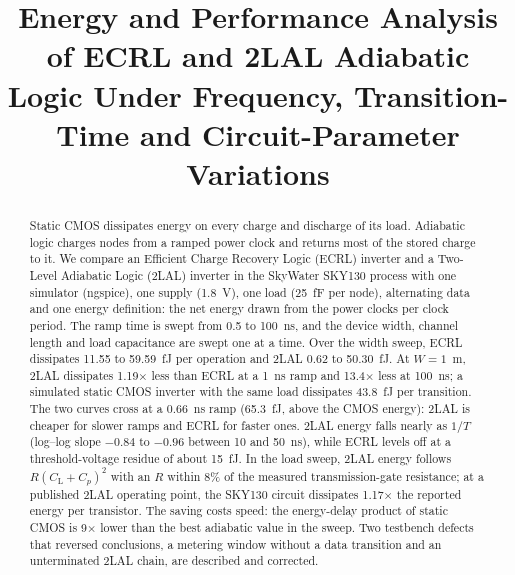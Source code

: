 \documentclass[conference]{IEEEtran}
\newcommand{\CL}{C_{\mathrm{L}}}
\begin{document}
\title{Energy and Performance Analysis of ECRL and 2LAL Adiabatic Logic Under
Frequency, Transition-Time and Circuit-Parameter Variations}

\author{%
}

\maketitle

\begin{abstract}
Static CMOS dissipates energy on every charge and discharge of its load.
Adiabatic logic charges nodes from a ramped power clock and returns most of
the stored charge to it. We compare an Efficient Charge Recovery Logic (ECRL)
inverter and a Two-Level Adiabatic Logic (2LAL) inverter in the SkyWater
SKY130 process with one simulator (ngspice), one supply (1.8~V), one load
(25~fF per node), alternating data and one energy definition: the net energy
drawn from the power clocks per clock period. The ramp time is swept from 0.5
to 100~ns, and the device width, channel length and load capacitance are swept
one at a time. Over the width sweep, ECRL dissipates 11.55 to 59.59~fJ per
operation and 2LAL 0.62 to 50.30~fJ. At $W=1$~\textmu m, 2LAL dissipates
1.19$\times$ less than ECRL at a 1~ns ramp and 13.4$\times$ less at 100~ns; a
simulated static CMOS inverter with the same load dissipates 43.8~fJ per
transition. The two curves cross at a 0.66~ns ramp (65.3~fJ, above the CMOS
energy): 2LAL is cheaper for slower ramps and ECRL for faster ones. 2LAL
energy falls nearly as $1/T$ (log--log slope $-0.84$ to
$-0.96$ between 10 and 50~ns), while ECRL levels off at a threshold-voltage
residue of about 15~fJ. In the load sweep, 2LAL energy follows
$R(\CL+C_p)^2$ with an $R$ within 8\% of the measured transmission-gate
resistance; at a published 2LAL operating point, the SKY130 circuit dissipates
1.17$\times$ the reported energy per transistor. The saving costs speed: the
energy-delay product of static CMOS is 9$\times$ lower than the best adiabatic
value in the sweep. Two testbench defects that
reversed conclusions, a metering window without a data transition and an
unterminated 2LAL chain, are described and corrected.
\end{abstract}
\end{document}
